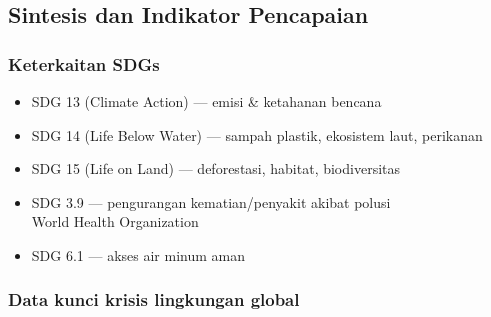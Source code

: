 \documentclass[
  letterpaper,
  DIV=11,
  numbers=noendperiod]{scrreprt}
\providecommand{\tightlist}{%
  \setlength{\itemsep}{0pt}\setlength{\parskip}{0pt}}
\begin{document}
\subsection{Sintesis dan Indikator
Pencapaian}\label{sintesis-dan-indikator-pencapaian}

\subsubsection{Keterkaitan SDGs}\label{keterkaitan-sdgs}

\begin{itemize}
\tightlist
\item
  SDG 13 (Climate Action) --- emisi \& ketahanan bencana
\item
  SDG 14 (Life Below Water) --- sampah plastik, ekosistem laut,
  perikanan
\item
  SDG 15 (Life on Land) --- deforestasi, habitat, biodiversitas
\item
  SDG 3.9 --- pengurangan kematian/penyakit akibat polusi\\
  World Health Organization
\item
  SDG 6.1 --- akses air minum aman
\end{itemize}

\subsubsection{Data kunci krisis lingkungan
global}\label{data-kunci-krisis-lingkungan-global}
\end{document}
